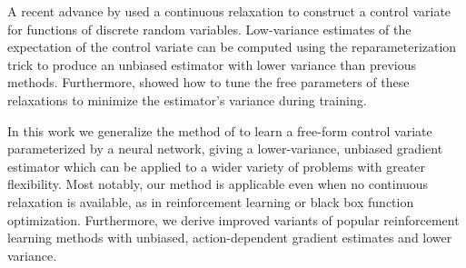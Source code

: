\documentclass{article}
\begin{document}
A recent advance by \citet{tucker2017rebar} used a continuous relaxation to construct a control variate for functions of discrete random variables.
Low-variance estimates of the expectation of the control variate can be computed using the reparameterization trick to produce an unbiased estimator with lower variance than previous methods.
Furthermore, \citet{tucker2017rebar} showed how to tune the free parameters of these relaxations to minimize the estimator's variance during training.

In this work we generalize the method of \citet{tucker2017rebar} to learn a free-form control variate parameterized by a neural network, giving a lower-variance, unbiased gradient estimator which can be applied to a wider variety of problems with greater flexibility.
Most notably, our method is applicable even when no continuous relaxation is available, as in reinforcement learning or black box function optimization.
Furthermore, we derive improved variants of popular reinforcement learning methods with unbiased, action-dependent gradient estimates and lower variance.%

\end{document}
